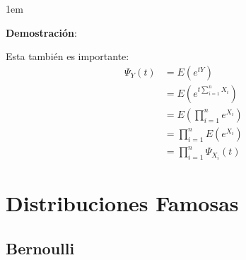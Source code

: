 \documentclass[12pt, fleqn]{report}                             %
\newenvironment{SmallIndentation}[1][0.75em]                    %
        {\begin{adjustwidth}{#1}{}\begin{footnotesize}}             %
        {\end{footnotesize}\end{adjustwidth}}                       %
\theoremstyle{break}                                            %
\newcommand{\Wrap}[1]{\left( #1 \right)}                        %
\begin{document}
\begin{itemize}
                        \begin{SmallIndentation}[1em]
                            \textbf{Demostración}:
                            
                            Esta también es importante:
                            \begin{align*}
                                \Psi_Y(t)
                                    &= E\Wrap{e^{tY}}                       \\
                                    &= E\Wrap{e^{t\sum_{i = 1}^n X_i}}      \\
                                    &= E\Wrap{\prod_{i = 1}^n e^{X_i}}      \\
                                    &= \prod_{i = 1}^n E\Wrap{e^{X_i}}      \\
                                    &= \prod_{i = 1}^n \Psi_{X_i}(t)
                            \end{align*}
                        
                        \end{SmallIndentation}


                \end{itemize}






    \chapter{Distribuciones Famosas}


        \clearpage
        \section{Bernoulli}


\end{document}
